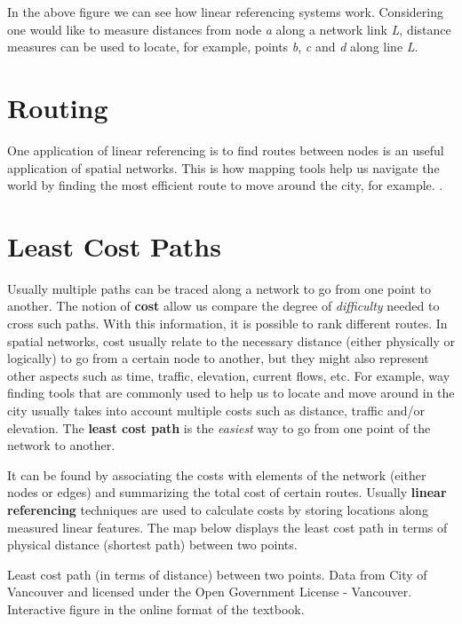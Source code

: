 \documentclass[
]{book}
\begin{document}
In the above figure we can see how linear referencing systems work. Considering one would like to measure distances from node \emph{a} along a network link \emph{L}, distance measures can be used to locate, for example, points \emph{b}, \emph{c} and \emph{d} along line \emph{L}.

\hypertarget{routing}{%
\section{Routing}\label{routing}}

One application of linear referencing is to find routes between nodes is an useful application of spatial networks. This is how mapping tools help us navigate the world by finding the most efficient route to move around the city, for example. \citep{systemsinnovationNetworkDiffusionContagion2015}.

\hypertarget{least-cost-paths}{%
\section{Least Cost Paths}\label{least-cost-paths}}

Usually multiple paths can be traced along a network to go from one point to another. The notion of \textbf{cost} allow us compare the degree of \emph{difficulty} needed to cross such paths. With this information, it is possible to rank different routes. In spatial networks, cost usually relate to the necessary distance (either physically or logically) to go from a certain node to another, but they might also represent other aspects such as time, traffic, elevation, current flows, etc. For example, way finding tools that are commonly used to help us to locate and move around in the city usually takes into account multiple costs such as distance, traffic and/or elevation. The \textbf{least cost path} is the \emph{easiest} way to go from one point of the network to another.

It can be found by associating the costs with elements of the network (either nodes or edges) and summarizing the total cost of certain routes. Usually \textbf{linear referencing} techniques are used to calculate costs by storing locations along measured linear features. The map below displays the least cost path in terms of physical distance (shortest path) between two points.

\label{fig:unnamed-chunk-22}Least cost path (in terms of distance) between two points. Data from City of Vancouver and licensed under the Open Government License - Vancouver. Interactive figure in the online format of the textbook.
\end{document}
